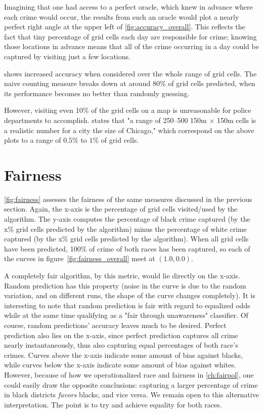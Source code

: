 Imagining that one had access to a perfect oracle, which knew in advance where each crime would occur, the results from such an oracle would plot a nearly perfect right angle at the upper left of \autoref{fig:accuracy_overall}. This reflects the fact that tiny percentage of grid cells each day are responsible for crime; knowing those locations in advance means that all of the crime occurring in a day could be captured by visiting just a few locations.

\pp shows increased accuracy when considered over the whole range of grid cells. The naive counting measure breaks down at around 80\% of grid cells predicted, when its performance becomes no better than randomly guessing.

However, visiting even 10\% of the grid cells on a map is unreasonable for police departments to accomplish. \citet{mohler_marked_2014} states that "a range of 250–500 150m $\times$ 150m cells is a realistic number for a city the size of Chicago," which correspond on the above plots to a range of $0.5\%$ to $1\%$ of grid cells.

\section{Fairness}
\autoref{fig:fairness} assesses the fairness of the same measures discussed in the previous section. Again, the x-axis is the percentage of grid cells visited/used by the algorithm. The y-axis computes the percentage of black crime captured (by the x\% grid cells predicted by the algorithm) minus the percentage of white crime captured (by the x\% grid cells predicted by the algorithm). When all grid cells have been predicted, 100\% of crime of both races has been captured, so each of the curves in figure~\ref{fig:fairness_overall} meet at $(1.0, 0.0)$.

A completely fair algorithm, by this metric, would lie directly on the x-axis. Random prediction has this property (noise in the curve is due to the random variation, and on different runs, the shape of the curve changes completely). It is interesting to note that random prediction is fair with regard to equalized odds while at the same time qualifying as a "fair through unawareness" classifier. Of course, random predictions' accuracy leaves much to be desired. Perfect prediction also lies on the x-axis, since perfect prediction captures all crime nearly instantaneously, thus also capturing equal percentages of both race's crimes. Curves above the x-axis indicate some amount of bias against blacks, while curves below the x-axis indicate some amount of bias against whites. However, because of how we operationalized race and fairness in \autoref{ch:fairpol}, one could easily draw the opposite conclusions: capturing a larger percentage of crime in black districts \emph{favors} blacks, and vice versa. We remain open to this alternative interpretation. The point is to try and achieve equality for both races.

